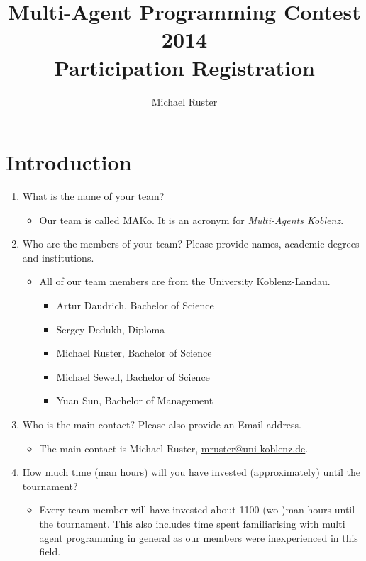 \documentclass{llncs}
\begin{document}
\title{Multi-Agent Programming Contest 2014\\Participation Registration}
\author{Michael Ruster}
\maketitle

\section*{Introduction}

\begin{enumerate}
\item What is the name of your team?
  \begin{itemize}
    \item Our team is called MAKo. It is an acronym for \emph{Multi-Agents Koblenz}.
  \end{itemize}
\item Who are the members of your team? Please provide names, academic degrees and institutions.
  \begin{itemize}
    \item All of our team members are from the University Koblenz-Landau.\begin{itemize}
    \item Artur Daudrich, Bachelor of Science
    \item Sergey Dedukh, Diploma
    \item Michael Ruster, Bachelor of Science
    \item Michael Sewell, Bachelor of Science
    \item Yuan Sun, Bachelor of Management
  \end{itemize}
  \end{itemize}
\item Who is the main-contact? Please also provide an Email address.
  \begin{itemize}
    \item The main contact is Michael Ruster, \href{mailto:mruster@uni-koblenz.de}{mruster@uni-koblenz.de}.
  \end{itemize}
\item How much time (man hours) will you have invested (approximately) until the tournament?
  \begin{itemize}
    \item Every team member will have invested about 1100 (wo-)man hours until the tournament. This also includes time spent familiarising with multi agent programming in general as our members were inexperienced in this field.
  \end{itemize}

\end{enumerate}
\end{document}
